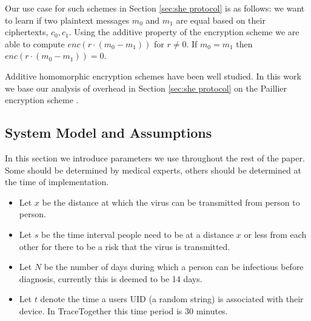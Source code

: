 \documentclass{article}
\begin{document}
Our use case for such schemes in Section \ref{sec:she protocol} is as follows: we want to learn if two plaintext messages $m_0$ and $m_1$ are equal based on their ciphertexts, $c_0, c_1$. Using the additive property of the encryption scheme we are able to compute $\mathit{enc}(r \cdot (m_0 - m_1))$ for $r \neq 0$. If $m_0 = m_1$ then $\mathit{enc}(r \cdot (m_0 - m_1)) = 0$. 

Additive homomorphic encryption schemes have been well studied. In this work we base our analysis of overhead in Section \ref{sec:she protocol} on the Paillier encryption scheme \cite{DBLP:conf/eurocrypt/Paillier99}. 

\subsection{System Model and Assumptions}\label{sec:Assumptions}

In this section we introduce parameters we use throughout the rest of the paper. Some should be determined by medical experts, others should be determined at the time of implementation.

\begin{itemize}
    \item Let $x$ be the distance at which the virus can be transmitted from person to person.
    \item Let $s$ be the time interval people need to be at a distance $x$ or less from each other for there to be a risk that the virus is transmitted.
    \item Let $N$ be the number of days during which a person can be infectious before diagnosis, currently this is deemed to be 14 days. 
    \item Let $t$ denote the time a users UID (a random string) is associated with their device. In TraceTogether this time period is 30 minutes.
\end{itemize}
\end{document}

